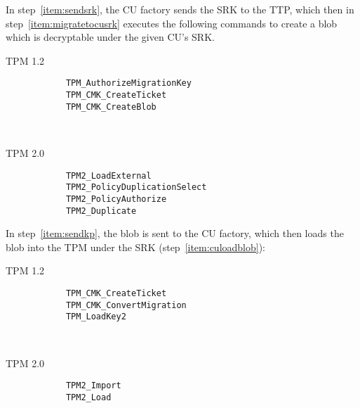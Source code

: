 {In step~\ref{item:sendsrk}, the CU factory sends the SRK to the TTP, which then in step~\ref{item:migratetocusrk} executes the following commands to create a blob which is decryptable under the given CU's SRK.
\begin{center}
	\begin{minipage}{0.4\linewidth}
		\begin{center}
			TPM 1.2
		\end{center}
		\begin{tpmcommands}
			\begin{verbatim}
			TPM_AuthorizeMigrationKey
			TPM_CMK_CreateTicket
			TPM_CMK_CreateBlob
			\end{verbatim}
		\end{tpmcommands}
	\end{minipage}
	~~~~~~~~
	\begin{minipage}{0.4\linewidth}
		\begin{center}
			TPM 2.0
		\end{center}
		\begin{tpmcommands}
			\begin{verbatim}
			TPM2_LoadExternal
			TPM2_PolicyDuplicationSelect
			TPM2_PolicyAuthorize
			TPM2_Duplicate
			\end{verbatim}
		\end{tpmcommands}
	\end{minipage}
\end{center}

In step~\ref{item:sendkp}, the blob is sent to the CU factory, which then loads the blob into the TPM under the SRK (step~\ref{item:culoadblob}):
\begin{center}
	\begin{minipage}{0.4\linewidth}
		\begin{center}
			TPM 1.2
		\end{center}
		\begin{tpmcommands}
			\begin{verbatim}
			TPM_CMK_CreateTicket
			TPM_CMK_ConvertMigration
			TPM_LoadKey2
			\end{verbatim}
		\end{tpmcommands}
	\end{minipage}
	~~~~~~~~
	\begin{minipage}{0.4\linewidth}
		\begin{center}
			TPM 2.0
		\end{center}
		\begin{tpmcommands}
			\begin{verbatim}
			TPM2_Import
			TPM2_Load
			\end{verbatim}
		\end{tpmcommands}
	\end{minipage}
\end{center}

}
